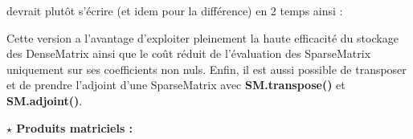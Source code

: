 \documentclass[11pt]{article}
\begin{document}
\vspace{2 mm}

\noindent
devrait plutôt s'écrire (et idem pour la différence) en 2 temps ainsi :

\vspace{2 mm}	
	
\begin{center}
\end{center}

\vspace{2 mm}

\noindent
Cette version a l'avantage d'exploiter pleinement la haute efficacité du stockage des DenseMatrix ainsi que le coût réduit de l'évaluation des SparseMatrix uniquement sur ses coefficients non nuls. Enfin, il est aussi possible de transposer et de prendre l'adjoint d'une SparseMatrix avec \textbf{SM.transpose()} et \textbf{SM.adjoint()}.

\newpage

\noindent
\textbf{$\star$ Produits matriciels :}~~ 

\vspace{5 mm}
\end{document}
